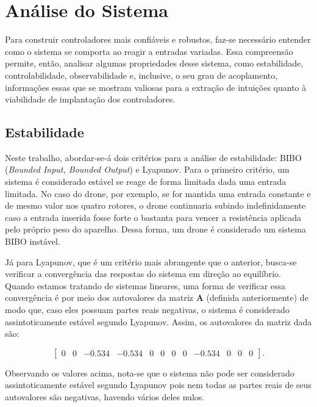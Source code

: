 \section{Análise do Sistema}
Para construir controladores mais confiáveis e robustos, faz-se necessário entender como o sistema se comporta ao 
reagir a entradas variadas. Essa compreensão permite, então, analisar algumas propriedades desse sistema, como 
estabilidade, controlabilidade, observabilidade e, inclusive, o seu grau de acoplamento, informações essas 
que se mostram valiosas para a extração de intuições quanto à viabilidade de implantação dos controladores.

\subsection{Estabilidade}
Neste trabalho, abordar-se-á dois critérios para a análise de estabilidade: BIBO (\textit{Bounded Input, Bounded 
Output}) e Lyapunov. Para o primeiro critério, 
um sistema é considerado estável se reage de forma limitada dada uma entrada limitada. No caso do drone, por exemplo, 
se for mantida uma entrada constante e de mesmo valor nos quatro rotores, o drone continuaria subindo indefinidamente 
caso a entrada inserida fosse forte o bastanta para vencer a resistência aplicada pelo próprio peso do aparelho. Dessa 
forma, um drone é considerado um sistema BIBO instável.

Já para Lyapunov, que é um critério mais abrangente que o anterior, busca-se verificar a convergência das respostas 
do sistema em direção ao equilíbrio. Quando estamos tratando de sistemas lineares, uma forma de verificar essa 
convergência é por meio dos autovalores da matriz $\mathbf{A}$ (definida anteriormente) de modo que, caso eles possuam 
partes reais negativas, o sistema é considerado assintoticamente estável segundo Lyapunov. Assim, os autovalores 
da matriz dada são:

\begin{equation*}
    \left[\begin{array}{cccccccccccc}
        0 & 0 & -0.534 & -0.534 & 0 & 0 & 0 & 0 & -0.534 & 0 & 0 & 0
    \end{array}\right].
\end{equation*}

Observando os valores acima, nota-se que o sistema não pode ser considerado assintoticamente estável segundo Lyapunov 
pois nem todas as partes reais de seus autovalores são negativas, havendo vários deles nulos.

